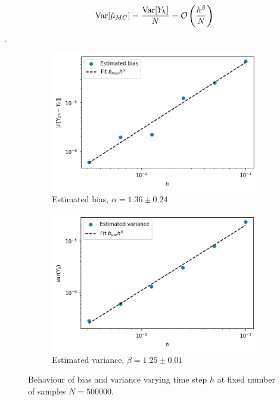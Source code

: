 \begin{equation} \label{eq:var_mc}
\text{Var}[\hat{\mu}_{MC}] = \frac{\text{Var}[Y_h]}{N} = \mathcal{O}\left(\frac{h^\beta}{N}\right)
\end{equation}.

\begin{figure}[h]
\begin{subfigure}{0.5\textwidth}
\includegraphics[width=\textwidth]{graphics/b/weak_asian.png}
\caption{Estimated bias, $\alpha = 1.36 \pm 0.24$}
\end{subfigure}
\begin{subfigure}{0.5\textwidth}
\includegraphics[width=\textwidth]{graphics/b/variance_asian.png}
\caption{Estimated variance, $\beta = 1.25 \pm 0.01$}
\end{subfigure}
\caption{Behaviour of bias and variance varying time step $h$ at fixed number of samples $N = 500000$.}
\label{fig:weak_var_mc}
\end{figure}

